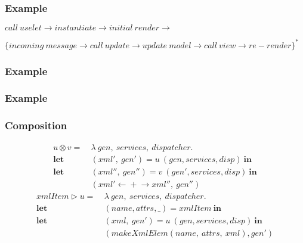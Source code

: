 \documentclass{beamer}
\begin{document}
  \begin{frame}
    \frametitle{Example}

    $call\ uselet \rightarrow instantiate \rightarrow initial\ render \rightarrow$

$ \{ incoming\ message \rightarrow call\ update \rightarrow update\ model \rightarrow call\ view \rightarrow re\!-\!render\}^*$
  \end{frame}
  \begin{frame}
    \frametitle{Example}
      
  \end{frame}
  \begin{frame}
    \frametitle{Example}
      
  \end{frame}
  \begin{frame}
    \frametitle{Composition}
      \begin{align*}
u \otimes v =\ &\lambda\ gen,\:services,\:dispatcher. \\
  \bm{let}\ &(xml',\ gen') = u\ (gen, services, disp)\ \bm{in} \\
  \bm{let}\ &(xml'',\ gen'') = v\ (gen', services, disp)\ \bm{in} \\
      &(xml' \leftarrow\!\!\!\!\!\!\!+\!\!\!\!\!\!\!\rightarrow xml'',\ gen'')
      \end{align*}
      \begin{align*}
xmlItem \triangleright u = \ &\lambda\ gen,\:services,\:dispatcher. \\
  \bm{let}\ &(name, attrs, \_) = xmlItem\ \bm{in}\\
  \bm{let}\ &(xml,\ gen') = u\ (gen, services, disp)\ \bm{in}\\
     &(makeXmlElem(name,\:attrs,\:xml), gen')
      \end{align*}
  \end{frame}
\end{document}
